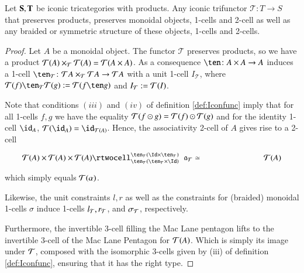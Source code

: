  
 \begin{lem}
  Let ${\bf S,T}$ be iconic tricategories with products. Any iconic trifunctor $\mathcal{T}: T \rightarrow S$ that preserves products, preserves  monoidal objects, 1-cells and 2-cell as well as any braided or symmetric structure of these objects, 1-cells and 2-cells.
 \end{lem}
 
 \begin{proof}
Let $A$ be a monoidal object. The functor $\mathcal{T}$ preserves products, so we have a product $\mathcal{T}(A) \times_{\mathcal{T}} \mathcal{T}(A) = \mathcal{T}(A \times A)$. As a consequence $\ten\maps
  A\times A\to A$ induces a 1-cell $\ten_{\mathcal{T}} \maps
 \mathcal{T}A\times_{\cT} \mathcal{T} A\to\mathcal{T}A$ with a unit 1-cell $I_{\mathcal{T}}$, where $\cT(f) \ten_{\cT} \cT(g) := \cT(f \ten g)$ and $I_{\mathcal{T}}:= \mathcal{T}(I)$. 
 
 Note that conditions $(iii)$ and $(iv)$ of definition \ref{def:Iconfunc} imply that for all 1-cells $f,g$ we have the equality $\mathcal{T}(f \odot g) = \mathcal{T}(f) \odot \mathcal{T}(g)$ and for the identity 1-cell $\id_A$, $\cT(\id_A) = \id_{\cT(A)}$. Hence, the associativity 2-cell of $A$ gives rise to a 2-cell
  \[\vcenter{\xymatrix@C=6pc{\cT(A)\times\cT(A)\times\cT(A) \rtwocell^{\ten_{\cT}
        (\Id\times\ten_{\cT})}_{\ten_{\cT}(\ten_{\cT}\times\Id)}{\hspace{.2cm}\fa_{\cT}\eqv} &\cT(A) }}\]
  which simply equals $\mathcal{T}(\alpha)$.
  
  Likewise, the unit constraints $l, r$ as well as the constraints for (braided) monoidal 1-cells $\sigma$ induce 1-cells $l_{\mathcal{T}}, r_{\mathcal{T}}$, and $\sigma_{\mathcal{T}}$, respectively.
  
 Furthermore, the invertible 3-cell filling the Mac Lane pentagon lifts to the invertible 3-cell of the Mac Lane Pentagon for $\mathcal{T}(A)$. Which is simply its image under $\mathcal{T}$, composed with the isomorphic $3$-cells given by (iii) of definition \ref{def:Iconfunc}, ensuring that it has the right type.
  

\end{proof}
